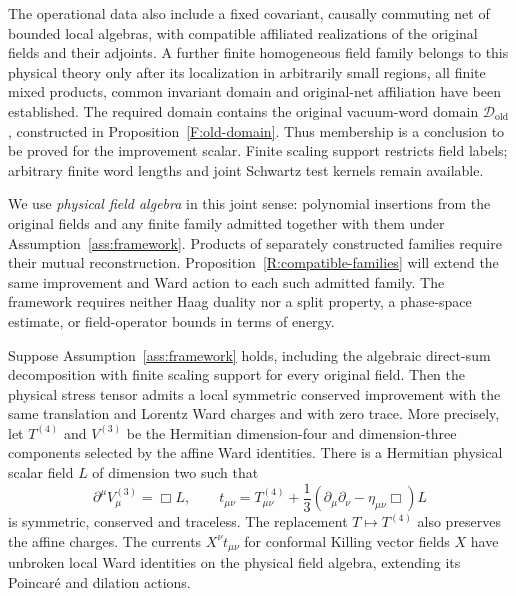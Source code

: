 The operational data also include a fixed covariant, causally commuting
net of bounded local algebras, with compatible affiliated realizations
of the original fields and their adjoints. A further finite homogeneous
field family belongs to this physical theory only after its localization
in arbitrarily small regions, all finite mixed products, common invariant
domain and original-net affiliation have been established. The required
domain contains the original vacuum-word domain
$\mathcal D_{\mathrm{old}}$, constructed in
Proposition~\ref{F:old-domain}. Thus membership is a conclusion to be
proved for the improvement scalar. Finite scaling support restricts
field labels; arbitrary finite word lengths and joint Schwartz test
kernels remain available.

We use \emph{physical field algebra} in this joint sense: polynomial
insertions from the original fields and any finite family admitted
together with them under Assumption~\ref{ass:framework}. Products of
separately constructed families require their mutual reconstruction.
Proposition~\ref{R:compatible-families} will extend the same improvement
and Ward action to each such admitted family. The framework requires
neither Haag duality nor a split property, a phase-space estimate, or
field-operator bounds in terms of energy.

\begin{theorem}\label{thm:main}
Suppose Assumption~\ref{ass:framework} holds, including the algebraic
direct-sum decomposition with finite scaling support for every original
field. Then the physical stress tensor admits a local symmetric conserved
improvement with the same translation and Lorentz Ward charges and with
zero trace. More precisely, let $T^{(4)}$ and $V^{(3)}$
be the Hermitian dimension-four and dimension-three components selected
by the affine Ward identities. There is a Hermitian physical scalar
field $L$ of dimension two such that
\begin{equation}\label{eq:intro-improvement}
 \partial^\mu V^{(3)}_\mu=\Box L,
 \qquad
 t_{\mu\nu}=T^{(4)}_{\mu\nu}
       +\frac13(\partial_\mu\partial_\nu-\eta_{\mu\nu}\Box)L
\end{equation}
is symmetric, conserved and traceless. The replacement $T\mapsto T^{(4)}$ also preserves the affine charges. The currents $X^\nu t_{\mu\nu}$ for conformal Killing vector fields $X$ have unbroken local Ward identities on the physical field algebra, extending its Poincar\'e and dilation actions.
\end{theorem}

